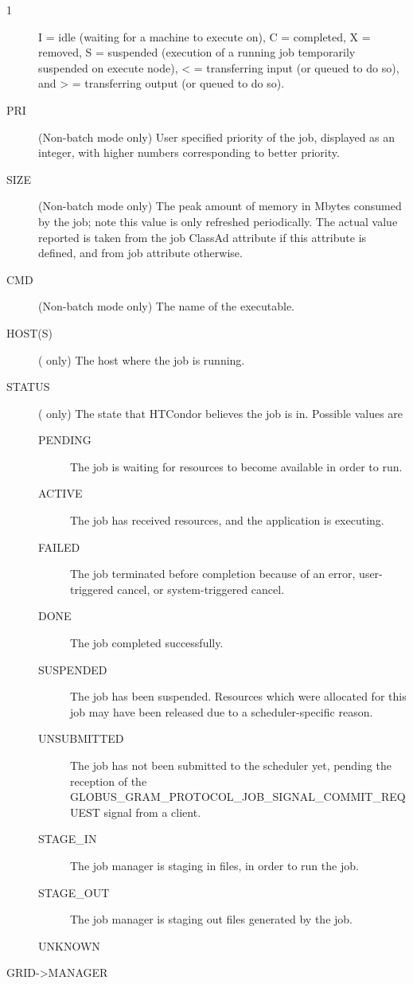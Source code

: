 \begin{ManPage}{\label{man-condor-q}}{1}
\begin{description}
	I = idle
        (waiting for a machine to execute on), C = completed, 
        X = removed,
		S = suspended (execution of a running job temporarily suspended on execute node),
        < = transferring input (or queued to do so), and
        > = transferring output (or queued to do so). 
\item[PRI] (Non-batch mode only) User specified priority of the job,
	displayed as an integer, with higher numbers corresponding to better
	priority. 
\item[SIZE] (Non-batch mode only) The peak amount of memory in Mbytes
	consumed by the job; note this value is only refreshed periodically.
	The actual value reported is taken from the job ClassAd attribute
	 if this attribute is defined, and from job
	attribute  otherwise.
\item[CMD] (Non-batch mode only) The name of the executable. 
\item[HOST(S)] ( only) The host where the job is running.
\item[STATUS] ( only) The state that HTCondor believes the job is in.
Possible values are
  \begin{description}
    \item[PENDING] The job is waiting for resources to become available
    in order to run.
    \item[ACTIVE] The job has received resources, and the application
    is executing.
    \item[FAILED] The job terminated before completion because of an error,
    user-triggered cancel, or system-triggered cancel.
    \item[DONE] The job completed successfully.
    \item[SUSPENDED] The job has been suspended.
    Resources which were allocated for this job may have been
    released due to a scheduler-specific reason.
    \item[UNSUBMITTED] The job has not been submitted to the scheduler yet,
    pending the reception of the 
    GLOBUS\_GRAM\_PROTOCOL\_JOB\_SIGNAL\_COMMIT\_REQUEST signal from a client.
    \item[STAGE\_IN] The job manager is staging in files,
    in order to run the job.
    \item[STAGE\_OUT] The job manager is staging out files
    generated by the job.
    \item[UNKNOWN]
  \end{description}
\item[GRID->MANAGER] 

\end{description}
\end{ManPage}
